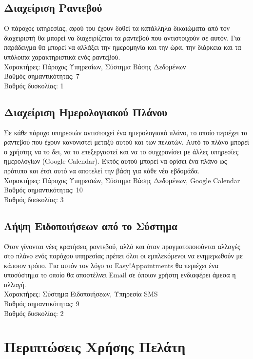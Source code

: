 \documentclass[12pt]{article}
\begin{document}
\subsection{Διαχείριση Ραντεβού}
Ο πάροχος υπηρεσίας, αφού του έχουν δοθεί τα κατάλληλα δικαιώματα από τον διαχειριστή θα μπορεί να διαχειρίζεται τα ραντεβού που αντιστοιχούν σε αυτόν. Για παράδειγμα θα μπορεί να αλλάξει την ημερομηνία και την ώρα, την διάρκεια και τα υπόλοιπα χαρακτηριστικά ενός ραντεβού.
\\[0.3cm]
Χαρακτήρες: Πάροχος Υπηρεσίων, Σύστημα Βάσης Δεδομένων
\\[0.3cm]
Βαθμός σημαντικότητας: 7
\\[0.3cm]
Βαθμός δυσκολίας: 1

\subsection{Διαχείριση Ημερολογιακού Πλάνου}
Σε κάθε πάροχο υπηρεσιών αντιστοιχεί ένα ημερολογιακό πλάνο, το οποίο περιέχει τα ραντεβού που έχουν κανονιστεί μεταξύ αυτού και των πελατών. Αυτό το πλάνο μπορεί ο χρήστης να το δει, να το επεξεργαστεί και να το συγχρονίσει με άλλες υπηρεσίες ημερολογίων (Google Calendar). Εκτός αυτού μπορεί να ορίσει ένα πλάνο ως πρότυπο και έτσι αυτό να αποτελεί την βάση για κάθε νέα εβδομάδα.
\\[0.3cm] 
Χαρακτήρες: Πάροχος Υπηρεσιών, Σύστημα Βάσης Δεδομένων, Google Calendar
\\[0.3cm]
Βαθμός σημαντικότητας: 10
\\[0.3cm]
Βαθμός δυσκολίας: 3

\subsection{Λήψη Ειδοποιήσεων από το Σύστημα}
Όταν γίνονται νέες κρατήσεις ραντεβού, αλλά και όταν πραγματοποιούνται αλλαγές στο πλάνο ενός παρόχου υπηρεσίας πρέπει όλοι οι εμπλεκόμενοι να ενημερωθούν με κάποιον τρόπο. Για αυτόν τον λόγο το Easy!Appointments θα περιέχει ένα υποσύστημα το οποίο θα αποστέλνει Email σε όποιον χρήστη ενδιαφέρει άμεσα η αλλαγή.
\\[0.3cm] 
Χαρακτήρες: Σύστημα Ειδοποιήσεων, Υπηρεσία SMS
\\[0.3cm]
Βαθμός σημαντικότητας: 9
\\[0.3cm]
Βαθμός δυσκολίας: 2

\section {Περιπτώσεις Χρήσης Πελάτη}
\end{document}
